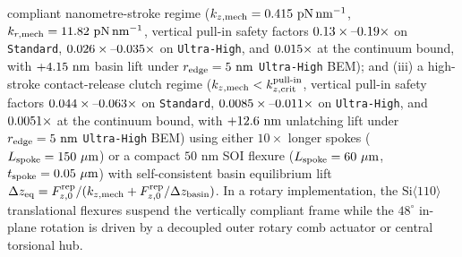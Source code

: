 \documentclass[pdflatex,sn-nature]{sn-jnl}
\DeclareRobustCommand{\roundtwo}[1]{\fpeval{round(#1,2)}}
\DeclareRobustCommand{\roundthree}[1]{\fpeval{round(#1,3)}}
\DeclareRobustCommand{\roundfour}[1]{\fpeval{round(#1,4)}}
\begin{document}
compliant nanometre-stroke regime ($k_{z,\rm mech} = \roundthree{\NatureRotCeightCompactNtwoLateralStabilityNmActuatorKZMechPnPerNm}\text{ pN}\,\text{nm}^{-1}$, $k_{r,\rm mech} = \roundtwo{\NatureRotCeightCompactNtwoLateralStabilityNmActuatorKRMechPnPerNm}\text{ pN}\,\text{nm}^{-1}$, vertical pull-in safety factors $\roundtwo{\NatureRotCeightCompactNtwoLateralStabilityNmActuatorVerticalPullInSafetyFactor}\times\text{--}\roundtwo{\NatureCantorNtwoHybridrzLateralStabilityNmActuatorVerticalPullInSafetyFactor}\times$ on \texttt{Standard}, $\roundthree{\NatureRotCeightCompactNtwoDiscretizationPullInBoundsSharpUltraSfPullInRegtwo}\times\text{--}\roundthree{\NatureCantorNtwoHybridrzDiscretizationPullInBoundsSharpUltraSfPullInRegtwo}\times$ on \texttt{Ultra-High}, and $\roundthree{\NatureCantorNtwoHybridrzDiscretizationPullInBoundsContinuumSfPullInRegtwo}\times$ at the continuum bound, with $+\roundtwo{\NatureCantorNtwoHybridrzDiscretizationPullInBoundsRfiveUltraLiftRegtwoNm}\text{ nm}$ basin lift under $r_{\rm edge}=5\text{ nm}$ \texttt{Ultra-High} BEM); and (iii) a high-stroke contact-release clutch regime ($k_{z,\rm mech} < k_{z,\rm crit}^{\rm pull\text{-}in}$, vertical pull-in safety factors $\roundthree{\NatureRotCeightCompactNtwoDiscretizationPullInBoundsStdSfPullInRegthree}\times\text{--}\roundthree{\NatureCantorNtwoHybridrzDiscretizationPullInBoundsStdSfPullInRegthree}\times$ on \texttt{Standard}, $\roundfour{\NatureRotCeightCompactNtwoDiscretizationPullInBoundsSharpUltraSfPullInRegthree}\times\text{--}\roundthree{\NatureCantorNtwoHybridrzDiscretizationPullInBoundsSharpUltraSfPullInRegthree}\times$ on \texttt{Ultra-High}, and $\roundfour{\NatureCantorNtwoHybridrzDiscretizationPullInBoundsContinuumSfPullInRegthree}\times$ at the continuum bound, with $+\roundtwo{\NatureCantorNtwoHybridrzDiscretizationPullInBoundsRfiveUltraLiftRegthreeNm}\text{ nm}$ unlatching lift under $r_{\rm edge}=5\text{ nm}$ \texttt{Ultra-High} BEM) using either $10\times$ longer spokes ($L_{\rm spoke} = \NatureRotCeightCompactNtwoLateralStabilitySoftClutchLSpokeUm{}\ \mu\text{m}$) or a compact $50\text{ nm}$ SOI flexure ($L_{\rm spoke} = \NatureRotCeightCompactNtwoLateralStabilityCompactClutchLSpokeUm{}\ \mu\text{m}$, $t_{\rm spoke} = \NatureRotCeightCompactNtwoLateralStabilityCompactClutchTSpokeUm{}\ \mu\text{m}$) with self-consistent basin equilibrium lift $\Delta z_{\rm eq} = F_{z,0}^{\rm rep}/(k_{z,\rm mech} + F_{z,0}^{\rm rep}/\Delta z_{\rm basin})$. In a rotary implementation, the $\text{Si}\langle 110\rangle$ translational flexures suspend the vertically compliant frame while the $48^\circ$ in-plane rotation is driven by a decoupled outer rotary comb actuator or central torsional hub.
\end{document}
